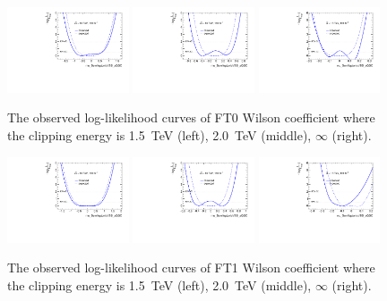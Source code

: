 \begin{figure}[ht]
    \centering
    \includegraphics[width=0.32\textwidth]{figures/aQGC/profileFT01500}
    	\includegraphics[width=0.32\textwidth]{figures/aQGC/profileFT02000}
        \includegraphics[width=0.32\textwidth]{figures/aQGC/profileFT0inf}
        \caption{The observed log-likelihood curves of FT0 Wilson coefficient where the clipping energy is 1.5~TeV (left), 2.0~TeV (middle), $\infty$ (right).}
        \label{fig:ProfileLLFT0}
\end{figure}
\begin{figure}[ht]
    \centering
    \includegraphics[width=0.32\textwidth]{figures/aQGC/profileFT11500}
    	\includegraphics[width=0.32\textwidth]{figures/aQGC/profileFT12000}
        \includegraphics[width=0.32\textwidth]{figures/aQGC/profileFT1inf}
        \caption{The observed log-likelihood curves of FT1 Wilson coefficient where the clipping energy is 1.5~TeV (left), 2.0~TeV (middle), $\infty$ (right).}
        \label{fig:ProfileLLFT1}
\end{figure}
